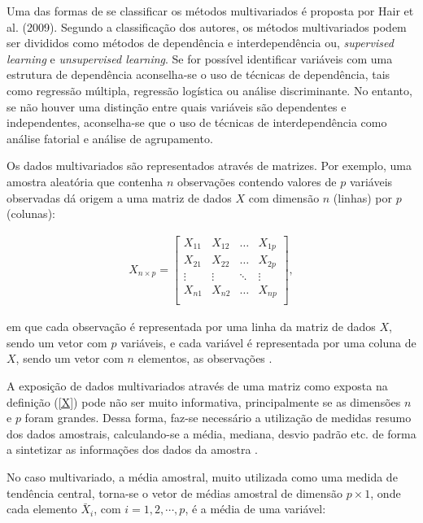 \documentclass[
	12pt,				%
	openright,			%
	oneside,			%
	a4paper,			%
	chapter=TITLE,		%
	section=TITLE,		%
	english,			%
	french,				%
	spanish,			%
	brazil				%
	]{abntex2}
\begin{document}
Uma das formas de se classificar os métodos multivariados é proposta por Hair et al. (2009). Segundo a classificação dos autores, os métodos multivariados podem ser divididos como métodos de dependência e interdependência ou, \textit{supervised learning} e \textit{unsupervised learning}. Se for possível identificar variáveis com uma estrutura de dependência aconselha-se o uso de técnicas de dependência, tais como regressão múltipla, regressão logística ou análise discriminante. No entanto, se não houver uma distinção entre quais variáveis são dependentes e independentes, aconselha-se que o uso de técnicas de interdependência como análise fatorial e análise de agrupamento. 

Os dados multivariados são representados através de matrizes. Por exemplo, uma amostra aleatória que contenha $n$ observações contendo valores de $p$ variáveis observadas dá origem a uma matriz de dados $X$ com dimensão $n$ (linhas) por $p$ (colunas):

\begin{align}\label{X}
X_{n \times p} =
\left[
\begin{array}{cccc}
X_{11} & X_{12} & \dots & X_{1p} \\
X_{21} & X_{22} & \dots & X_{2p} \\
\vdots & \vdots & \ddots & \vdots \\
X_{n1} & X_{n2} & \dots & X_{np}\\
\end{array}
\right],
\end{align}

\noindent em que cada observação é representada por uma linha da matriz de dados $X$, sendo um vetor com $p$ variáveis, e cada variável é representada por uma coluna de $X$, sendo um vetor com $n$ elementos, as observações \cite{everitt11}.

A exposição de dados multivariados através de uma matriz como exposta na definição (\ref{X}) pode não ser muito informativa, principalmente se as dimensões $n$ e $p$ foram grandes. Dessa forma, faz-se necessário a utilização de medidas resumo dos dados amostrais, calculando-se a média, mediana, desvio padrão etc. de forma a sintetizar as informações dos dados da amostra \cite{ferreira11}.  

No caso multivariado, a média amostral, muito utilizada como uma medida de tendência central, torna-se o vetor de médias amostral de dimensão $p \times 1$, onde cada elemento $\bar{X}_{i}$, com $i = 1,2,\cdots,p $, é a média de uma variável:
\end{document}
